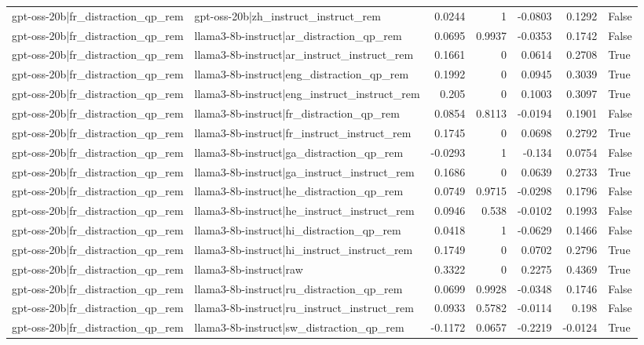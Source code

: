 \begin{table}
\begin{tabular}{l l r r r r l}
gpt-oss-20b|fr_distraction_qp_rem & gpt-oss-20b|zh_instruct_instruct_rem & 0.0244 & 1 & -0.0803 & 0.1292 & False \\
gpt-oss-20b|fr_distraction_qp_rem & llama3-8b-instruct|ar_distraction_qp_rem & 0.0695 & 0.9937 & -0.0353 & 0.1742 & False \\
gpt-oss-20b|fr_distraction_qp_rem & llama3-8b-instruct|ar_instruct_instruct_rem & 0.1661 & 0 & 0.0614 & 0.2708 & True \\
gpt-oss-20b|fr_distraction_qp_rem & llama3-8b-instruct|eng_distraction_qp_rem & 0.1992 & 0 & 0.0945 & 0.3039 & True \\
gpt-oss-20b|fr_distraction_qp_rem & llama3-8b-instruct|eng_instruct_instruct_rem & 0.205 & 0 & 0.1003 & 0.3097 & True \\
gpt-oss-20b|fr_distraction_qp_rem & llama3-8b-instruct|fr_distraction_qp_rem & 0.0854 & 0.8113 & -0.0194 & 0.1901 & False \\
gpt-oss-20b|fr_distraction_qp_rem & llama3-8b-instruct|fr_instruct_instruct_rem & 0.1745 & 0 & 0.0698 & 0.2792 & True \\
gpt-oss-20b|fr_distraction_qp_rem & llama3-8b-instruct|ga_distraction_qp_rem & -0.0293 & 1 & -0.134 & 0.0754 & False \\
gpt-oss-20b|fr_distraction_qp_rem & llama3-8b-instruct|ga_instruct_instruct_rem & 0.1686 & 0 & 0.0639 & 0.2733 & True \\
gpt-oss-20b|fr_distraction_qp_rem & llama3-8b-instruct|he_distraction_qp_rem & 0.0749 & 0.9715 & -0.0298 & 0.1796 & False \\
gpt-oss-20b|fr_distraction_qp_rem & llama3-8b-instruct|he_instruct_instruct_rem & 0.0946 & 0.538 & -0.0102 & 0.1993 & False \\
gpt-oss-20b|fr_distraction_qp_rem & llama3-8b-instruct|hi_distraction_qp_rem & 0.0418 & 1 & -0.0629 & 0.1466 & False \\
gpt-oss-20b|fr_distraction_qp_rem & llama3-8b-instruct|hi_instruct_instruct_rem & 0.1749 & 0 & 0.0702 & 0.2796 & True \\
gpt-oss-20b|fr_distraction_qp_rem & llama3-8b-instruct|raw & 0.3322 & 0 & 0.2275 & 0.4369 & True \\
gpt-oss-20b|fr_distraction_qp_rem & llama3-8b-instruct|ru_distraction_qp_rem & 0.0699 & 0.9928 & -0.0348 & 0.1746 & False \\
gpt-oss-20b|fr_distraction_qp_rem & llama3-8b-instruct|ru_instruct_instruct_rem & 0.0933 & 0.5782 & -0.0114 & 0.198 & False \\
gpt-oss-20b|fr_distraction_qp_rem & llama3-8b-instruct|sw_distraction_qp_rem & -0.1172 & 0.0657 & -0.2219 & -0.0124 & True \\

\end{tabular}
\end{table}

